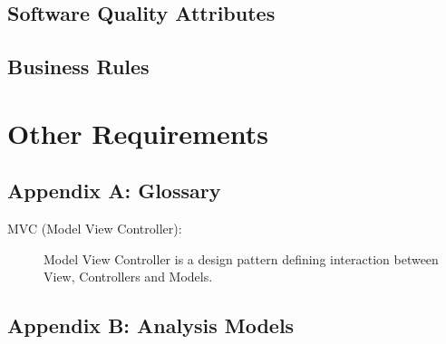 \documentclass[11pt]{article}
\begin{document}
\subsection{Software Quality Attributes}
\label{sec:org1f5fe7e}
\subsection{Business Rules}
\label{sec:org53e0420}
\section{Other Requirements}
\label{sec:org104a584}
\subsection*{Appendix A: Glossary}
\label{sec:org0a3bda7}
\begin{description}
\item[{MVC (Model View Controller):}] Model View Controller is a design pattern defining interaction between View, Controllers and Models.
\end{description}
\subsection*{Appendix B: Analysis Models}
\label{sec:orgb83e234}
\end{document}
